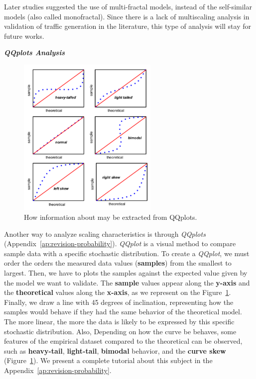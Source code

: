 Later studies suggested the use of multi-fractal models, instead of the self-similar models (also called monofractal)\cite{validate-trafficgen}\cite{udp-flows-model}. Since there is a lack of multiscaling analysis in validation of traffic generation in the literature, this type of analysis will stay for future works.

\smallskip \noindent \textbf{\textit{QQplots Analysis}}

\begin{figure}[ht!]
    \centering
    \includegraphics[width=0.6\textwidth]{figures/ch2/qqplot-tutorial}
    \caption{ How information about may be extracted from QQplots.}
    \label{fig:qqplot-tutorial}
\end{figure}


Another way to analyze scaling characteristics is through \textit{QQplots} (Appendix~\ref{ap:revision-probability})\cite{paper-qqplot}\cite{web-qq-tuto1}\cite{web-qq-tuto2}. \textit{\acrshort{QQplot}} is a visual method to compare sample data with a specific stochastic distribution.  To create a \textit{QQplot}, we must order the orders the measured data values (\textbf{samples}) from the smallest to largest. Then, we have to plots the samples against the expected value given by the model we want to validate. The \textbf{sample} values appear along the \textbf{y-axis} and the \textbf{theoretical} values along the \textbf{x-axis}, as we represent on the Figure~\ref{fig:qqplot-tutorial}. Finally, we draw a line with 45 degrees of inclination, representing how the samples would behave if they had the same behavior of the theoretical model. The more linear, the more the data is likely to be expressed by this specific stochastic distribution. Also, Depending on how the curve be behaves, some features of the empirical dataset compared to the theoretical can be observed, such as \textbf{heavy-tail}, \textbf{light-tail}, \textbf{bimodal} behavior, and the \textbf{curve skew} (Figure~\ref{fig:qqplot-tutorial}). We present a complete tutorial about this subject in the Appendix~\ref{ap:revision-probability}.

